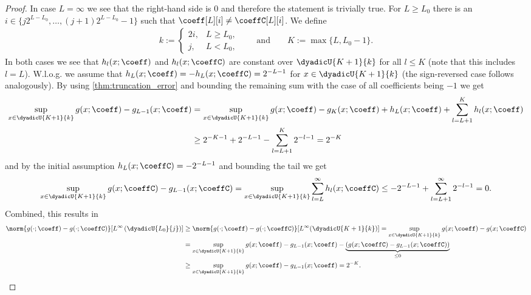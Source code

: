 \documentclass[twoside,11pt]{article}
\newcommand{\defeq}{\mathbin{:=}}
\begin{document}
\begin{proof}
 In case $L=\infty$ we see that the right-hand side is $0$ and therefore the statement is trivially true.
    For $L\geq L_0$ there is an $i\in\{j2^{L-L_0},\ldots,(j+1)2^{L-L_0}-1\}$ such that $\coeff[L][i]\neq\coeffC[L][i]$.
    We define
    \begin{align}
        k\defeq\begin{cases}
            2i,&L\geq L_0,\\
            j,&L<L_0,
        \end{cases}
        \qquad\text{and}\qquad
        K\defeq \max\{L,L_0-1\}.
    \end{align}
    In both cases we see that $h_l(x;\coeff)$ and $h_l(x;\coeffC)$ are constant over $\dyadicU{K+1}{k}$ for all $l\leq K$ (note that this includes $l=L$).
    W.l.o.g. we assume that $h_L(x;\coeff)=-h_L(x;\coeffC)=2^{-L-1}$ for $x\in\dyadicU{K+1}{k}$ (the sign-reversed case follows analogously).
    By using \cref{thm:truncation_error} and bounding the remaining sum with the case of all coefficients being $-1$ we get
    \begin{align}
        \sup_{x\in\dyadicU{K+1}{k}}g(x;\coeff)-g_{L-1}(x;\coeff)
        &=
        \sup_{x\in\dyadicU{K+1}{k}}g(x;\coeff)-g_{K}(x;\coeff)+h_{L}(x;\coeff)+\sum_{l=L+1}^{K}h_{l}(x;\coeff)
        \\&
        \geq
        2^{-K-1}+2^{-L-1}-\sum_{l=L+1}^{K}2^{-l-1}
        =2^{-K}
    \end{align}
    and by the initial assumption $h_L(x;\coeffC)=-2^{-L-1}$ and bounding the tail we get
    \begin{align}
        \sup_{x\in\dyadicU{K+1}{k}}g(x;\coeffC)-g_{L-1}(x;\coeffC)
        =
        \sup_{x\in\dyadicU{K+1}{k}}\sum_{l=L}^\infty h_l(x;\coeffC)
        \leq
        -2^{-L-1}+\sum_{l=L+1}^\infty2^{-l-1}
        = 0.
    \end{align}
    Combined, this results in
    \begin{align}
        \norm{g(\cdot;\coeff)-g(\cdot;\coeffC)}[{L^\infty\left(\dyadicU{L_0}{j}\right)}]
        &\geq %
        \norm{g(\cdot;\coeff)-g(\cdot;\coeffC)}[{L^\infty(\dyadicU{K+1}{k})}] %
        =
        \sup_{x\in\dyadicU{K+1}{k}} g(x;\coeff)-g(x;\coeffC)
        \\&
        =
        \sup_{x\in\dyadicU{K+1}{k}} g(x;\coeff)-g_{L-1}(x;\coeff)-\underbrace{(g(x;\coeffC)-g_{L-1}(x;\coeffC))}_{\leq 0}
        \\&
        \geq
        \sup_{x\in\dyadicU{K+1}{k}} g(x;\coeff)-g_{L-1}(x;\coeff) %
        =2^{-K}.
    \end{align}
\end{proof}
\end{document}
